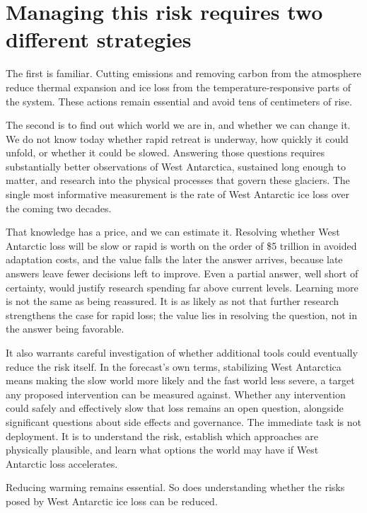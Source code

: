 \documentclass[11pt]{article}
\begin{document}
\section{Managing this risk requires two different strategies}

The first is familiar. Cutting emissions and removing carbon from the atmosphere reduce thermal expansion and ice loss from the temperature-responsive parts of the system. These actions remain essential and avoid tens of centimeters of rise.

The second is to find out which world we are in, and whether we can change it. We do not know today whether rapid retreat is underway, how quickly it could unfold, or whether it could be slowed. Answering those questions requires substantially better observations of West Antarctica, sustained long enough to matter, and research into the physical processes that govern these glaciers. The single most informative measurement is the rate of West Antarctic ice loss over the coming two decades.

That knowledge has a price, and we can estimate it. Resolving whether West Antarctic loss will be slow or rapid is worth on the order of \$5 trillion in avoided adaptation costs, and the value falls the later the answer arrives, because late answers leave fewer decisions left to improve. Even a partial answer, well short of certainty, would justify research spending far above current levels. Learning more is not the same as being reassured. It is as likely as not that further research strengthens the case for rapid loss; the value lies in resolving the question, not in the answer being favorable.

It also warrants careful investigation of whether additional tools could eventually reduce the risk itself. In the forecast's own terms, stabilizing West Antarctica means making the slow world more likely and the fast world less severe, a target any proposed intervention can be measured against. Whether any intervention could safely and effectively slow that loss remains an open question, alongside significant questions about side effects and governance. The immediate task is not deployment. It is to understand the risk, establish which approaches are physically plausible, and learn what options the world may have if West Antarctic loss accelerates.

Reducing warming remains essential. So does understanding whether the risks posed by West Antarctic ice loss can be reduced.
\end{document}
